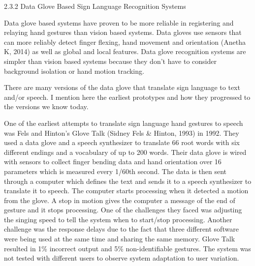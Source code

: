 2.3.2 Data Glove Based Sign Language Recognition Systems 

Data glove based systems have proven to be more reliable in registering and relaying hand gestures than vision based systems. Data gloves use sensors that can more reliably detect finger flexing, hand movement and orientation (Anetha K, 2014) as well as global and local features. Data glove recognition systems are simpler than vision based systems because they don’t have to consider background isolation or hand motion tracking. 

There are many versions of the data glove that translate sign language to text and/or speech. I mention here the earliest prototypes and how they progressed to the versions we know today. 

One of the earliest attempts to translate sign language hand gestures to speech was Fels and Hinton’s Glove Talk (Sidney Fels \& Hinton, 1993) in 1992. They used a data glove and a speech synthesizer to translate 66 root words with six different endings and a vocabulary of up to 200 words. 
Their data glove is wired with sensors to collect finger bending data and hand orientation over 16 parameters which is measured every 1/60th second. The data is then sent through a computer which defines the text and sends it to a speech synthesizer to translate it to speech. The computer starts processing when it detected a motion from the glove. A stop in motion gives the computer a message of the end of gesture and it stops processing. One of the challenges they faced was adjusting the singing speed to tell the system when to start/stop processing. Another challenge was the response delays due to the fact that three different software were being used at the same time and sharing the same memory. Glove Talk resulted in 1\% incorrect output and 5\% non-identifiable gestures. The system was not tested with different users to observe system adaptation to user variation. 

